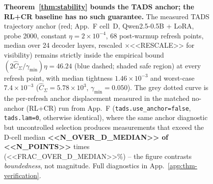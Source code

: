 \begin{figure}[t]
{%
}
\caption{\textbf{Theorem~\ref{thm:stability} bounds the TADS anchor;
the RL+CR baseline has no such guarantee.} The measured
\textsc{TADS} trajectory anchor (red; App.~F cell~D, Qwen2.5-0.5B +
LoRA, probe 2000, constant $\eta = 2\times 10^{-4}$, 68 post-warmup
refresh points, median over 24 decoder layers, rescaled
$\times$<<RESCALE>> for visibility) remains strictly inside the
empirical bound
$(2\hat{C}_\Sigma/\gamma_{\min})\eta = 46.24$ (blue dashed; shaded
safe region) at every refresh point, with median tightness
$1.46\times 10^{-3}$ and worst-case $7.4\times 10^{-3}$
($\hat{C}_\Sigma = 5.78\times 10^{3}$, $\gamma_{\min} = 0.050$).
The grey dotted curve is the per-refresh anchor displacement
measured in the matched no-anchor (RL+CR) run from App.~F
(\texttt{tads.use\_anchor=false}, \texttt{tads.lam=0}, otherwise
identical), where the same anchor diagnostic but uncontrolled
selection produces measurements that exceed the D-cell median
\textbf{<<N\_OVER\_D\_MEDIAN>> of <<N\_POINTS>>} times
(<<FRAC\_OVER\_D\_MEDIAN>>\%) -- the figure contrasts
\emph{boundedness}, not magnitude. Full diagnostics in
App.~\ref{app:thm-verification}.}
\label{fig:thm-main}
\end{figure}
